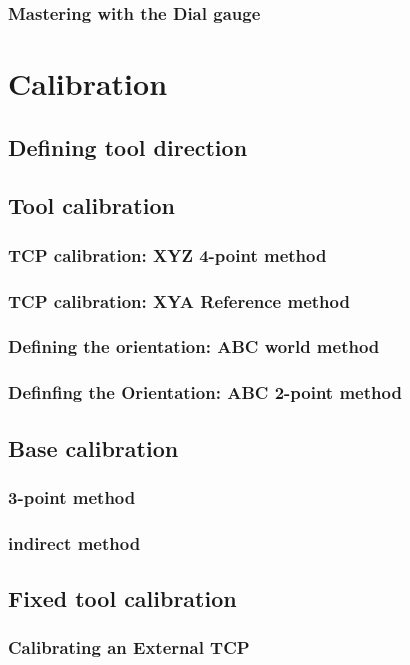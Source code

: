 \documentclass{book}
\begin{document}
			\subsubsection{Mastering with the Dial gauge}
	\newpage
		\section{Calibration}
			\subsection{Defining tool direction}
			
			\subsection{Tool calibration}
				\subsubsection{TCP calibration: XYZ 4-point method}
				\subsubsection{TCP calibration: XYA Reference method}
				\subsubsection{Defining the orientation: ABC world method}
				\subsubsection{Definfing the Orientation: ABC 2-point method}
				
			\subsection{Base calibration}
				\subsubsection{3-point method}
				\subsubsection{indirect method}
				
			\subsection{Fixed tool calibration}
				\subsubsection{Calibrating an External TCP}
\end{document}
